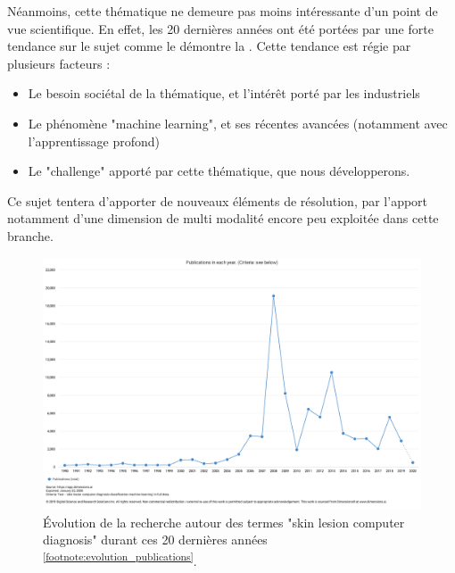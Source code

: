 Néanmoins, cette thématique ne demeure pas moins intéressante d’un point de vue scientifique. En effet, les 20 dernières années ont été portées par une forte tendance sur le sujet comme le démontre la . Cette tendance est régie par plusieurs facteurs :
\begin{itemize}
\item Le besoin sociétal de la thématique, et l'intérêt porté par les industriels
\item Le phénomène "machine learning", et ses récentes avancées (notamment avec l'apprentissage profond)
\item Le "challenge" apporté par cette thématique, que nous développerons.
\end{itemize}\par
Ce sujet tentera d’apporter de nouveaux éléments de résolution, par l’apport notamment d’une dimension de multi modalité encore peu exploitée dans cette branche. 
\begin{figure}[H]
    \centering
    \includegraphics[width=\linewidth]{contents/i_introduction/resources/evolution_publications.pdf}
    \caption{Évolution de la recherche autour des termes "skin lesion computer diagnosis" durant ces 20 dernières années \textsuperscript{\ref{footnote:evolution_publications}}.}
    \label{fig:evolution_publications}
\end{figure}\par
\addtocounter{footnote}{1}
\clearpage